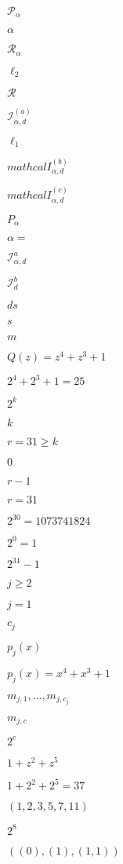 \documentclass{article}
\begin{document}
$\mathcal P_{\alpha}$
\pagebreak

$\alpha$
\pagebreak

$\mathcal R_{\alpha}$
\pagebreak

$\ell_2$
\pagebreak

$\mathcal R$
\pagebreak

$\mathcal I^{(a)}_{\alpha, d}$
\pagebreak

$\ell_1$
\pagebreak

$mathcal I^{(b)}_{\alpha, d}$
\pagebreak

$mathcal I^{(c)}_{\alpha, d}$
\pagebreak

$P_\alpha$
\pagebreak

$\alpha=$
\pagebreak

$\mathcal I^{a}_{\alpha, d}$
\pagebreak

$\mathcal I^{b}_{d}$
\pagebreak

$ds$
\pagebreak

$s$
\pagebreak

$m$
\pagebreak

$Q(z) = z^4 + z^3 + 1$
\pagebreak

$2^4 + 2^3 + 1 = 25$
\pagebreak

$2^k$
\pagebreak

$k$
\pagebreak

$r = 31 \geq k$
\pagebreak

$0$
\pagebreak

$r − 1$
\pagebreak

$r = 31$
\pagebreak

$2^30= 1 073 741 824$
\pagebreak

$2^0= 1$
\pagebreak

$2^31 - 1$
\pagebreak

$j \geq 2$
\pagebreak

$j=1$
\pagebreak

$c_j$
\pagebreak

$p_j(x)$
\pagebreak

$p_{j}(x) = x^4 + x^3 + 1$
\pagebreak

$m_{j,1}, \dots, m_{j,c_j}$
\pagebreak

$m_{j,c}$
\pagebreak

$2^c$
\pagebreak

$ 1 + z^2 + z^5 $
\pagebreak

$ 1 + 2^2 + 2^5 = 37$
\pagebreak

$(1, 2, 3, 5, 7, 11)$
\pagebreak

$2^8$
\pagebreak

$((0), (1), (1,1))$
\pagebreak
\end{document}
